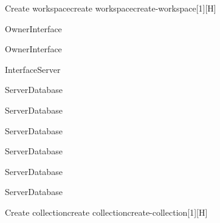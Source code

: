 \begin{toexclude}
\begin{sdfig}{Create workspace}{create workspace}{create-workspace}[1][H]
  \begin{seqdigauth}[Owner]
    \begin{umlcall}[op={Create workspace},return={Redirect to workspace creation}]{Owner}{Interface}
    \end{umlcall}
    \begin{umlcall}[op={Submit name}]{Owner}{Interface}
      \begin{umlcall}[op={Create workspace},return=Ok]{Interface}{Server}
        \begin{umlcall}[op={Create project}]{Server}{Database}
          \begin{umlcall}[op={Create collection}]{Server}{Database}
            \begin{umlcall}[op={Create field}]{Server}{Database}
            \end{umlcall}
            \begin{umlcall}[op={Create view}]{Server}{Database}
            \end{umlcall}
            \begin{umlcall}[op={Create document}]{Server}{Database}
              \begin{umlcall}[op={Create block}]{Server}{Database}
              \end{umlcall}
            \end{umlcall}
          \end{umlcall}
        \end{umlcall}
      \end{umlcall}
    \end{umlcall}
  \end{seqdigauth}
\end{sdfig}

\begin{sdfig}{Create collection}{create collection}{create-collection}[1][H]


\end{sdfig}
\end{toexclude}
